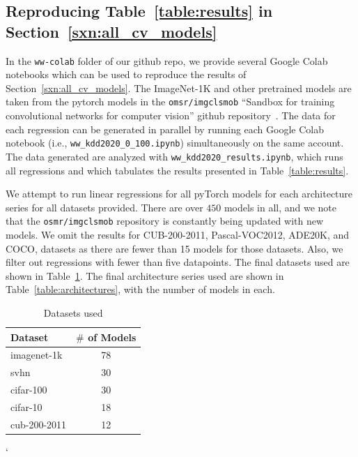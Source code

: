 \subsection{Reproducing Table~\ref{table:results} in Section~\ref{sxn:all_cv_models} }

In the \texttt{ww-colab} folder of our github repo, we provide several Google Colab notebooks which can be used to reproduce the results of Section~\ref{sxn:all_cv_models}.
The ImageNet-1K and other pretrained models are taken from the pytorch models in the \texttt{omsr/imgclsmob} 
``Sandbox for training convolutional networks for computer vision'' github repository~\cite{osmr}.
The data for each regression can be generated in parallel by running each Google Colab notebook (i.e., \texttt{ww\_kdd2020\_0\_100.ipynb}) simultaneously on the same account.
The data generated are analyzed with \texttt{ww\_kdd2020\_results.ipynb}, which runs all regressions and which tabulates the results presented in Table~\ref{table:results}.

We attempt to run linear regressions for all pyTorch models for each architecture series for all datasets provided.  
There are over $450$ models in all, and we note that the \texttt{osmr/imgclsmob} repository is constantly being updated with new models.
We omit the results for CUB-200-2011, Pascal-VOC2012, ADE20K, and COCO, datasets as there are fewer than 15 models for those datasets.  
Also, we filter out regressions with fewer than five datapoints.
The final datasets used are shown in Table~\ref{table:datasets}.
The final architecture series used are shown in  Table~\ref{table:architectures}, with the number of models in each.

\begin{table}[t]
\small
\begin{center}
\begin{tabular}{|p{1in}|c|}
\hline
Dataset & $\#$ of Models \\
\hline
imagenet-1k   &  78 \\
svhn          &  30 \\
cifar-100     &  30 \\
cifar-10      &  18 \\
cub-200-2011  &  12 \\
\hline
\end{tabular}
\end{center}
\caption{Datasets used}
\label{table:datasets}
\end{table}`

